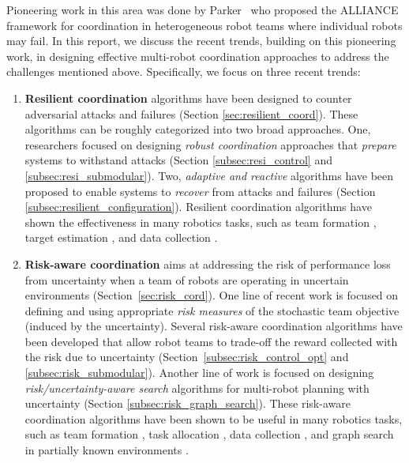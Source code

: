 Pioneering work in this area was done by Parker~\cite{parker1994heterogeneous} who proposed the ALLIANCE framework for coordination in heterogeneous robot teams where individual robots may fail. In this report, we discuss the recent trends, building on this pioneering work, in designing effective multi-robot coordination approaches to address the challenges mentioned above.  Specifically, we focus on three recent trends: 
\begin{enumerate}
    \item \textbf{Resilient coordination} algorithms have been designed to counter adversarial attacks and failures (Section \ref{sec:resilient_coord}). These algorithms can be roughly categorized into two broad approaches. One, researchers focused on designing \textit{robust coordination} approaches that \emph{prepare} systems to withstand attacks \cite{zhou2018resilient,saldana2017resilient} (Section \ref{subsec:resi_control} and \ref{subsec:resi_submodular}). Two, \textit{adaptive and reactive} algorithms have been proposed to enable systems to \emph{recover} from attacks and failures \cite{ramachandran2019resilience,song2020care} (Section \ref{subsec:resilient_configuration}). Resilient coordination algorithms have shown the effectiveness in many robotics tasks, such as team formation \cite{saldana2017resilient}, target estimation \cite{mitra2019resilient}, and data collection \cite{zhou2018resilient,schlotfeldt2018resilient}.
    
    \item \textbf{Risk-aware coordination} aims at addressing the risk of performance loss from uncertainty when a team of robots are operating in uncertain environments (Section~\ref{sec:risk_cord}). One line of recent work is focused on defining and using appropriate \textit{risk measures} of the stochastic team objective (induced by the uncertainty). Several risk-aware coordination algorithms have been developed that allow robot teams to trade-off the reward collected with the risk due to uncertainty \cite{park2018robust,yang2017algorithm,zhou2018approximation} (Section~\ref{subsec:risk_control_opt} and \ref{subsec:risk_submodular}). Another line of work is focused on designing \textit{risk/uncertainty-aware search} algorithms for multi-robot planning with uncertainty \cite{oliehoek2016concise} (Section \ref{subsec:risk_graph_search}). These risk-aware coordination algorithms have been shown to be useful in many robotics tasks, such as team formation \cite{park2018robust,zhu2019chance}, task allocation \cite{yang2017algorithm}, data collection \cite{zhou2018approximation}, and graph search in partially known environments \cite{oliehoek2016concise}. 
    

\end{enumerate}
